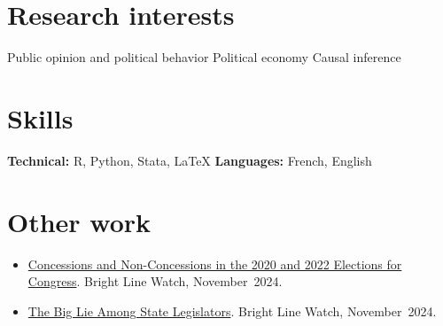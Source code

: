\documentclass[margin, 10pt]{res}
\begin{document}
\begin{resume}
\section{Research \newline interests}
Public opinion and political behavior
\newline Political economy
\newline Causal inference

\section{Skills}

\textbf{Technical:} R, Python, Stata, \LaTeX
\newline
\null \textbf{Languages:} French, English

\section{Other work}
\begin{itemize}
	\item \href{https://brightlinewatch.org/refusing-to-admit-defeat/}{Concessions and Non-Concessions in the 2020 and 2022 Elections for Congress}. Bright Line Watch, November~2024.
	\item \href{https://brightlinewatch.org/the-big-lie-among-state-legislators/}{The Big Lie Among State Legislators}. Bright Line Watch, November~2024.
\end{itemize}

\end{resume}
\end{document}
